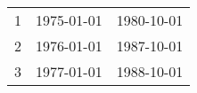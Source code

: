 % 
\begin{tabular}{ccc}
  \hline
  \hline
1 & 1975-01-01 & 1980-10-01 \\ 
  2 & 1976-01-01 & 1987-10-01 \\ 
  3 & 1977-01-01 & 1988-10-01 \\ 
   \hline
\end{tabular}
